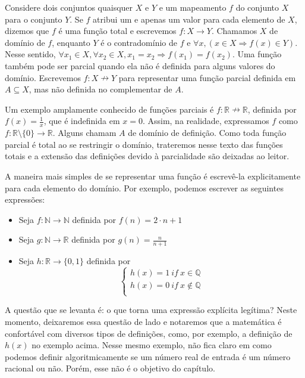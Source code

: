 Considere dois conjuntos quaisquer $X$ e $Y$ e um mapeamento $f$ do conjunto
$X$ para o conjunto $Y$. Se $f$ atribui um e apenas um valor para cada
elemento de $X$, dizemos que $f$ é uma função total e escrevemos $f: X \to Y$.
Chamamos $X$ de domínio de $f$, enquanto $Y$ é o contradomínio de $f$ e
$\forall x, (x \in X  \Rightarrow f(x) \in Y)$. Nesse sentido, $\forall x_1
\in X, \forall x_2 \in X, x_1 = x_2 \Rightarrow f(x_1) = f(x_2)$. Uma função
também pode ser parcial quando ela não é definida para alguns valores do
domínio. Escrevemos $f: X \nrightarrow Y $ para representar uma função parcial
definida em $A \subseteq X $, mas não definida no complementar de $A$. 

Um exemplo amplamente conhecido de funções parciais é $f: \mathbb{R}
\nrightarrow \mathbb{R}$, definida por $f(x) = \frac{1}{x}$, que é indefinida
em $x = 0$. Assim, na realidade, expressamos $f$ como $f : \mathbb{R}
\setminus \{0\} \to \mathbb{R}$. Alguns chamam $A$ de domínio de definição.
Como toda função parcial é total ao se restringir o domínio, trateremos nesse
texto das funções totais e a extensão das definições devido à parcialidade são
deixadas ao leitor.  

A maneira mais simples de se representar uma função é escrevê-la
explicitamente para cada elemento do domínio. Por exemplo, podemos escrever as
seguintes expressões:

\begin{itemize}
    \item Seja $f: \mathbb{N} \to \mathbb{N}$ definida por $f(n) = 2\cdot n +
    1$
    \item Seja $g : \mathbb{N} \to \mathbb{R}$ definida por $g(n) =
    \frac{n}{n+1}$
    \item Seja $h : \mathbb{R} \to \{0,1\}$ definida por
    $$\left \{ \begin{array}{c} h(x) = 1 ~if~x \in \mathbb{Q} \\
    h(x) = 0 ~ if ~ x \not \in \mathbb{Q} \\
    \end{array}
    \right. $$
 \end{itemize}

A questão que se levanta é: o que torna uma expressão explícita legítima?
Neste momento, deixaremos essa questão de lado e notaremos que a matemática é
confortável com diversos tipos de definições, como, por exemplo, a definição
de $h(x)$ no exemplo acima. Nesse mesmo exemplo, não fica claro em como
podemos definir algoritmicamente se um número real de entrada é um número
racional ou não. Porém, esse não é o objetivo do capítulo.

